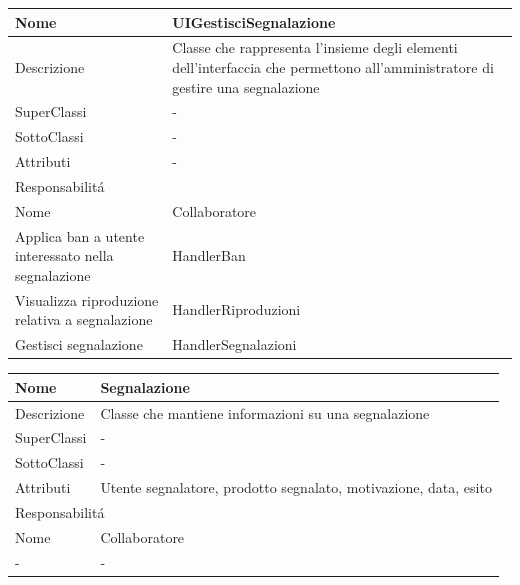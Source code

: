 \begin{center}
    \begin{longtable}{ |p{3cm}|p{3cm}|p{3cm}|p{3cm}| }
        \hline
        Nome & \multicolumn{3}{|p{9cm}|}{UIGestisciSegnalazione} \\\hline
        Descrizione & \multicolumn{3}{|p{9cm}|}{Classe che rappresenta l'insieme degli elementi dell'interfaccia che permettono all'amministratore di gestire una segnalazione} \\\hline
        SuperClassi & \multicolumn{3}{|p{9cm}|}{-} \\\hline
        SottoClassi & \multicolumn{3}{|p{9cm}|}{-} \\\hline
        Attributi & \multicolumn{3}{|p{9cm}|}{-} \\\hline
        \multicolumn{4}{|p{12cm}|}{Responsabilit\'a} \\\hline
        \multicolumn{2}{|p{5cm}|}{Nome} & \multicolumn{2}{|p{7cm}|}{Collaboratore} \\\hline
        \multicolumn{2}{|p{5cm}|}{Applica ban a utente interessato nella segnalazione} & \multicolumn{2}{|p{7cm}|}{HandlerBan} \\\hline
        \multicolumn{2}{|p{5cm}|}{Visualizza riproduzione relativa a segnalazione} & \multicolumn{2}{|p{7cm}|}{HandlerRiproduzioni} \\\hline
        \multicolumn{2}{|p{5cm}|}{Gestisci segnalazione} & \multicolumn{2}{|p{7cm}|}{HandlerSegnalazioni} \\\hline
    \end{longtable}
\end{center}

\begin{center}
    \begin{tabular}{ |p{3cm}|p{3cm}|p{3cm}|p{3cm}| }
        \hline
        Nome & \multicolumn{3}{|p{9cm}|}{Segnalazione} \\\hline
        Descrizione & \multicolumn{3}{|p{9cm}|}{Classe che mantiene informazioni su una segnalazione} \\\hline
        SuperClassi & \multicolumn{3}{|p{9cm}|}{-} \\\hline
        SottoClassi & \multicolumn{3}{|p{9cm}|}{-} \\\hline
        Attributi & \multicolumn{3}{|p{9cm}|}{Utente segnalatore, prodotto segnalato, motivazione, data, esito} \\\hline
        \multicolumn{4}{|p{12cm}|}{Responsabilit\'a} \\\hline
        \multicolumn{2}{|p{6cm}|}{Nome} & \multicolumn{2}{|p{6cm}|}{Collaboratore} \\\hline
        \multicolumn{2}{|p{6cm}|}{-} & \multicolumn{2}{|p{6cm}|}{-} \\\hline
    \end{tabular}
\end{center}

